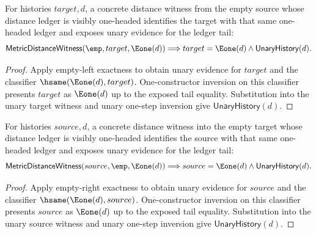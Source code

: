 \begin{theorem}
\label{thm:metric-distance-witness-empty-source-e1-distance-target-exactness}
For histories $target,d$, a concrete distance witness from the empty source
whose distance ledger is visibly one-headed identifies the target with that
same one-headed ledger and exposes unary evidence for the ledger tail:
$$
\mathsf{MetricDistanceWitness}(\emp,target,\Eone(d))
\Longrightarrow
target=\Eone(d)\land\mathsf{UnaryHistory}(d).
$$
\end{theorem}
\begin{proof}
Apply empty-left exactness to obtain unary evidence for $target$ and the
classifier $\hsame(\Eone(d),target)$. One-constructor inversion on this
classifier presents $target$ as $\Eone(d)$ up to the exposed tail equality.
Substitution into the unary target witness and unary one-step inversion give
$\mathsf{UnaryHistory}(d)$.
\end{proof}

\begin{theorem}
\label{thm:metric-distance-witness-empty-target-e1-distance-source-exactness}
For histories $source,d$, a concrete distance witness into the empty target
whose distance ledger is visibly one-headed identifies the source with that
same one-headed ledger and exposes unary evidence for the ledger tail:
$$
\mathsf{MetricDistanceWitness}(source,\emp,\Eone(d))
\Longrightarrow
source=\Eone(d)\land\mathsf{UnaryHistory}(d).
$$
\end{theorem}
\begin{proof}
Apply empty-right exactness to obtain unary evidence for $source$ and the
classifier $\hsame(\Eone(d),source)$. One-constructor inversion on this
classifier presents $source$ as $\Eone(d)$ up to the exposed tail equality.
Substitution into the unary source witness and unary one-step inversion give
$\mathsf{UnaryHistory}(d)$.
\end{proof}

